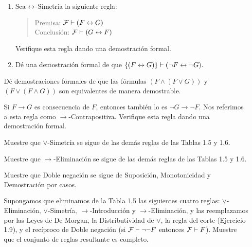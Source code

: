 \message{ !name(main.tex)}\documentclass[12pt,a4paper]{book}
\begin{document}
    \begin{ejercicio}
        \begin{enumerate}[label=(\alph*)]
            \item Sea $\leftrightarrow$-Simetría la siguiente regla:
            \begin{quote}
                Premisa: $\mathcal{F}\vdash(F\leftrightarrow G)$\\
                Conclusión: $\mathcal{F}\vdash(G\leftrightarrow F)$
            \end{quote}
            Verifique esta regla dando una demostración formal.
            \item Dé una demostración formal de que $\{(F\leftrightarrow G)\}\vdash(\neg F\leftrightarrow\neg G)$.
        \end{enumerate}
    \end{ejercicio}

    \begin{ejercicio}
        Dé demostraciones formales de que las fórmulas $(F\wedge(F\vee G))$ y $(F\vee(F\wedge G))$ son equivalentes de
        manera demostrable.
    \end{ejercicio}

    \begin{ejercicio}
        Si $F\rightarrow G$ es consecuencia de $F$, entonces también lo es $\neg G\rightarrow\neg F$. Nos referimos a esta
        regla como $\rightarrow$-Contrapositiva. Verifique esta regla dando una demostración formal.
    \end{ejercicio}

    \begin{ejercicio}
        Muestre que $\vee$-Simetría se sigue de las demás reglas de las Tablas 1.5 y 1.6.
    \end{ejercicio}

    \begin{ejercicio}
        Muestre que $\rightarrow$-Eliminación se sigue de las demás reglas de las Tablas 1.5 y 1.6.
    \end{ejercicio}

    \begin{ejercicio}
        Muestre que Doble negación se sigue de Suposición, Monotonicidad y Demostración por casos.
    \end{ejercicio}

    \begin{ejercicio}
        Supongamos que eliminamos de la Tabla 1.5 las siguientes cuatro reglas: $\vee$-Eliminación, $\vee$-Simetría,
        $\rightarrow$-Introducción y $\rightarrow$-Eliminación, y las reemplazamos por las Leyes de De Morgan, la
        Distributividad de $\vee$, la regla del corte (Ejercicio 1.9), y el recíproco de Doble negación (si
        $\mathcal{F}\vdash\neg\neg F$ entonces $\mathcal{F}\vdash F$). Muestre que el conjunto de reglas resultante es completo.
    \end{ejercicio}
\end{document}

